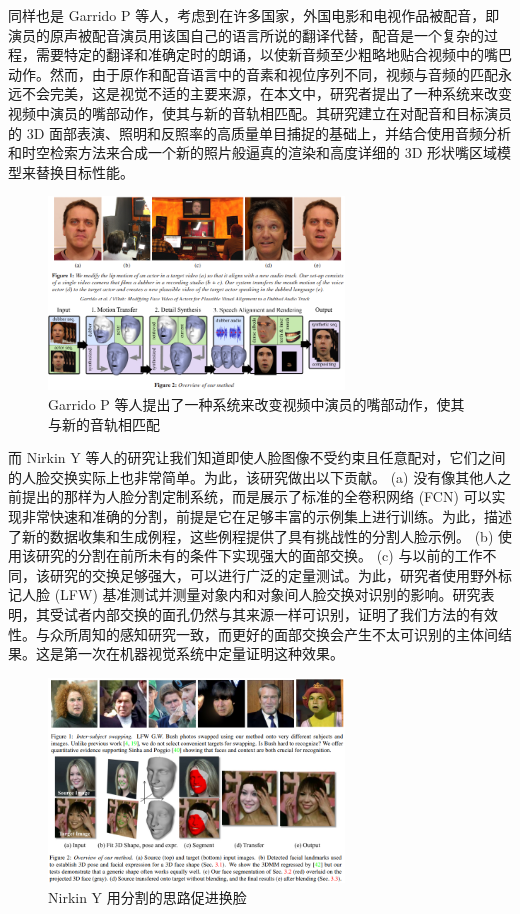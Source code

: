 同样也是 Garrido P 等人\cite{garrido2015vdub}，考虑到在许多国家，外国电影和电视作品被配音，即演员的原声被配音演员用该国自己的语言所说的翻译代替，配音是一个复杂的过程，需要特定的翻译和准确定时的朗诵，以使新音频至少粗略地贴合视频中的嘴巴动作。然而，由于原作和配音语言中的音素和视位序列不同，视频与音频的匹配永远不会完美，这是视觉不适的主要来源，在本文中，研究者提出了一种系统来改变视频中演员的嘴部动作，使其与新的音轨相匹配。其研究建立在对配音和目标演员的 3D 面部表演、照明和反照率的高质量单目捕捉的基础上，并结合使用音频分析和时空检索方法来合成一个新的照片般逼真的渲染和高度详细的 3D 形状嘴区域模型来替换目标性能。

\begin{figure}[htb]
\centering 
\includegraphics[width=0.70\textwidth]{img/ch1m5.png} 
\caption{Garrido P 等人提出了一种系统来改变视频中演员的嘴部动作，使其与新的音轨相匹配}
\label{Test}
\end{figure}

而 Nirkin Y 等人\cite{nirkin2018face}的研究让我们知道即使人脸图像不受约束且任意配对，它们之间的人脸交换实际上也非常简单。为此，该研究做出以下贡献。 (a) 没有像其他人之前提出的那样为人脸分割定制系统，而是展示了标准的全卷积网络 (FCN) 可以实现非常快速和准确的分割，前提是它在足够丰富的示例集上进行训练。为此，描述了新的数据收集和生成例程，这些例程提供了具有挑战性的分割人脸示例。 (b) 使用该研究的分割在前所未有的条件下实现强大的面部交换。 (c) 与以前的工作不同，该研究的交换足够强大，可以进行广泛的定量测试。为此，研究者使用野外标记人脸 (LFW) 基准测试并测量对象内和对象间人脸交换对识别的影响。研究表明，其受试者内部交换的面孔仍然与其来源一样可识别，证明了我们方法的有效性。与众所周知的感知研究一致，而更好的面部交换会产生不太可识别的主体间结果。这是第一次在机器视觉系统中定量证明这种效果。

\begin{figure}[htb]
\centering 
\includegraphics[width=0.70\textwidth]{img/ch1m6.png} 
\caption{Nirkin Y 用分割的思路促进换脸}
\label{Test}
\end{figure}

